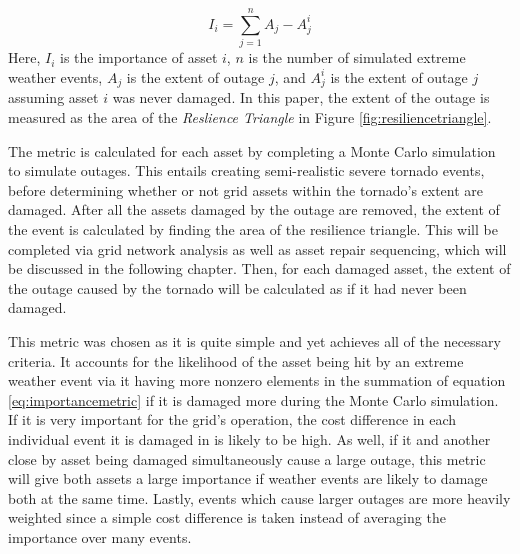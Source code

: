 \documentclass[12pt]{article}
\begin{document}
\begin{equation} 
    I_i = \sum_{j=1}^{n}A_j - A_j^i
    \label{eq:importancemetric}
\end{equation}
Here, $I_i$ is the importance of asset $i$, $n$ is the number of simulated extreme weather events, $A_j$ is the extent of outage $j$, and $A_j^i$ is the extent of outage $j$ assuming asset $i$ was never damaged. In this paper, the extent of the outage is measured as the area of the \textit{Reslience Triangle} in Figure \ref{fig:resiliencetriangle}. \par
The metric is calculated for each asset by completing a Monte Carlo simulation to simulate outages. This entails creating semi-realistic severe tornado events, before determining whether or not grid assets within the tornado’s extent are damaged. After all the assets damaged by the outage are removed, the extent of the event is calculated by finding the area of the resilience triangle. This will be completed via grid network analysis as well as asset repair sequencing, which will be discussed in the following chapter. Then, for each damaged asset, the extent of the outage caused by the tornado will be calculated as if it had never been damaged. \par
This metric was chosen as it is quite simple and yet achieves all of the necessary criteria. It accounts for the likelihood of the asset being hit by an extreme weather event via it having more nonzero elements in the summation of equation \eqref{eq:importancemetric} if it is damaged more during the Monte Carlo simulation. If it is very important for the grid's operation, the cost difference in each individual event it is damaged in is likely to be high. As well, if it and another close by asset being damaged simultaneously cause a large outage, this metric will give both assets a large importance if weather events are likely to damage both at the same time. Lastly, events which cause larger outages are more heavily weighted since a simple cost difference is taken instead of averaging the importance over many events.
\end{document}

